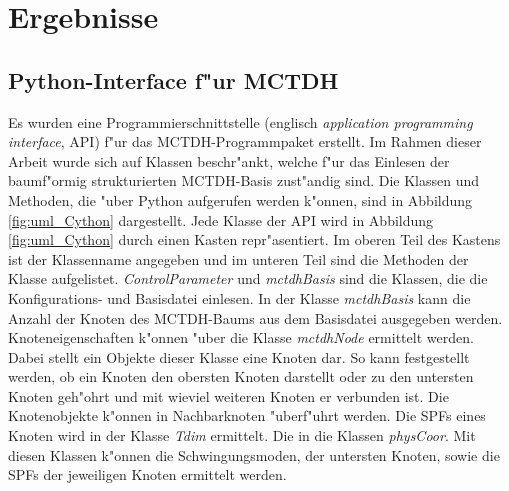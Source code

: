 \chapter{Ergebnisse}

\section{Python-Interface f"ur MCTDH}
\label{sec:PyInterface}


Es wurden eine Programmierschnittstelle (englisch \textit{application programming interface}, API) f"ur das MCTDH-Programmpaket erstellt.
Im Rahmen dieser Arbeit wurde sich auf Klassen beschr"ankt, welche f"ur das Einlesen der baumf"ormig strukturierten MCTDH-Basis zust"andig sind.
Die Klassen und Methoden, die "uber Python aufgerufen werden k"onnen, sind in Abbildung \ref{fig:uml_Cython} dargestellt. 
Jede Klasse der API wird in Abbildung \ref{fig:uml_Cython} durch einen Kasten repr"asentiert. Im oberen Teil des Kastens ist der Klassenname
angegeben und im unteren Teil sind die Methoden der Klasse aufgelistet. 
\textit{ControlParameter} und \textit{mctdhBasis} sind die Klassen, die die Konfigurations- und Basisdatei einlesen. 
In der Klasse \textit{mctdhBasis} kann die Anzahl der Knoten des MCTDH-Baums aus dem Basisdatei ausgegeben werden.
Knoteneigenschaften k"onnen "uber die Klasse \textit{mctdhNode}  ermittelt werden. Dabei stellt ein Objekte dieser Klasse
eine Knoten dar.
So kann festgestellt werden, ob ein Knoten den obersten Knoten darstellt oder zu den untersten Knoten geh"ohrt und mit wieviel weiteren Knoten er verbunden ist.
Die Knotenobjekte k"onnen in Nachbarknoten "uberf"uhrt werden.
Die SPFs eines Knoten wird in der Klasse \textit{Tdim} ermittelt. Die  in die Klassen \textit{physCoor}. Mit diesen Klassen k"onnen
die Schwingungsmoden, der untersten Knoten, sowie die SPFs der jeweiligen Knoten ermittelt werden. 

